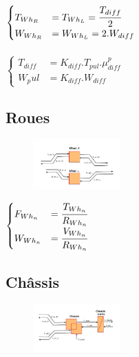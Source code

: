 $\begin{cases}
	T_{Wh_R} &= T_{Wh_L} = \cfrac{T_{diff}}{2} \\
	W_{Wh_R} &= W_{Wh_L} = 2.W_{diff}
\end{cases}$\\
~\\
$\begin{cases}
	 T_{diff} &= K_{diff}.T_{pul}.\mu{}_{diff}^{p}\\
	W_pul &= K_{diff}.W_{diff}
\end{cases}$

\subsection{Roues}

\begin{figure}
\includegraphics[width=0.3\textwidth]{images/Wheel.png}
\end{figure}

$\begin{cases}
	F_{Wh_n} &= \cfrac{T_{Wh_n}}{R_{Wh_n}}  \\
	W_{Wh_n} &= \cfrac{V_{Wh_n}}{R_{Wh_n}}
\end{cases}$

\subsection{Châssis}

\begin{figure}
\includegraphics[width=0.3\textwidth]{images/Chassis.png}
\end{figure}


